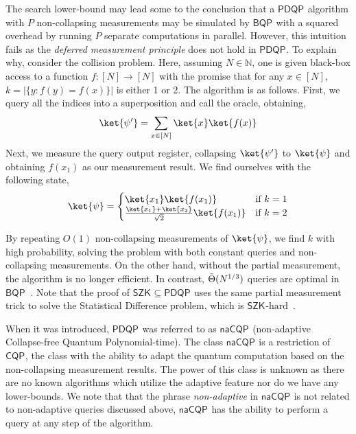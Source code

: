 \documentclass[10pt,a4paper]{article}
\newcommand{\abilityamount}[0]{\ensuremath{P}\xspace} %
\newcommand{\compclass}[2][]{\ensuremath{\mathsf{#2}^{#1}}\xspace}
\newcommand{\pdqpname}[0]{\compclass{PDQP}}
\newcommand{\bqpname}[0]{\compclass{BQP}}
\begin{document}
The search lower-bound may lead some to the conclusion that a \pdqpname algorithm with $\abilityamount$ non-collapsing measurements may be simulated by \bqpname with a squared overhead by running $\abilityamount$ separate computations in parallel. However, this intuition fails as the \emph{deferred measurement principle} does not hold in \pdqpname. To explain why, consider the collision problem. Here, assuming $N\in \mathbb{N}$, one is given black-box access to a function $f:[N] \rightarrow [N]$ with the promise that for any $x\in [N]$, $k = |\{y: f(y)=f(x)\}|$ is either 1 or 2. The algorithm is as follows. First, we query all the indices into a superposition and call the oracle, obtaining,
\begin{align*}
    \ket{\psi^\prime}=\sum_{x\in [N]} \ket{x}\ket{f(x)}
\end{align*}
Next, we measure the query output register, collapsing $\ket{\psi^\prime}$ to $\ket{\psi}$ and obtaining $f(x_1)$ as our measurement result. We find ourselves with the following state,
\begin{align*}
    \ket{\psi} = \begin{cases}
        \ket{x_1}\ket{f(x_1)} &\text{if }k=1\\
        \frac{\ket{x_1} + \ket{x_2}}{\sqrt{2}}\ket{f(x_1)} &\text{if }k=2
    \end{cases}
\end{align*}

By repeating $O(1)$ non-collapsing measurements of $\ket{\psi}$, we find $k$ with high probability, solving the problem with both constant queries and non-collapsing measurements. On the other hand, without the partial measurement, the algorithm is no longer efficient. In contrast, $\Tilde{\Theta}(N^{1/3})$ queries are optimal in \bqpname~\cite{collision_problem_algorithm, collision_element_distinctness_lower_bound}. Note that the proof of $\compclass{SZK}\subseteq \pdqpname$ uses the same partial measurement trick to solve the Statistical Difference problem, which is $\compclass{SZK}\text{-hard}$~\cite{szk_hard_problem}.

When it was introduced, \pdqpname was referred to as \compclass{naCQP} (non-adaptive Collapse-free Quantum Polynomial-time). The class \compclass{naCQP} is a restriction of \compclass{CQP}, the class with the ability to adapt the quantum computation based on the non-collapsing measurement results. The power of this class is unknown as there are no known algorithms which utilize the adaptive feature nor do we have any lower-bounds. We note that that the phrase \emph{non-adaptive} in \compclass{naCQP} is not related to non-adaptive queries discussed above, \compclass{naCQP} has the ability to perform a query at any step of the algorithm.
\end{document}
